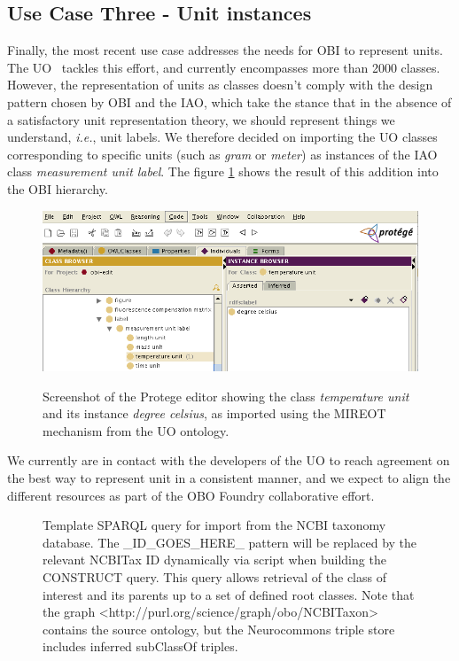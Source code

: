 \documentclass[jou]{ao2e}%
\begin{document}
\subsection{Use Case Three - Unit instances}

Finally, the most recent use case addresses the needs for \ac{OBI} to represent units. The \ac{UO}~\citep{PATO} tackles this effort, and currently encompasses more than 2000 classes. 
However, the representation of units as classes doesn't comply with the design pattern chosen by \ac{OBI} and the \ac{IAO}, which take the stance that in the absence of a satisfactory unit representation theory, we should represent things we understand, \emph{i.e.}, unit labels. 
We therefore decided on importing the \ac{UO} classes corresponding to specific units (such as \textit{gram} or \textit{meter}) as instances of the \ac{IAO} class \textit{measurement unit label}.
The figure \ref{fig:protege} shows the result of this addition into the \ac{OBI} hierarchy.

\begin{figure}[t]
\centering
{
\includegraphics[width=.9\linewidth]{./figs/protege.png}
}
\caption{Screenshot of the Protege editor showing the class \textit{temperature unit} and its instance \textit{degree celsius}, as imported using the \ac{MIREOT} mechanism from the \ac{UO} ontology.
}
\label{fig:protege}
\end{figure}

We currently are in contact with the developers of the \ac{UO} to reach agreement on the best way to represent unit in a consistent manner, and we expect to align the different resources as part of the \ac{OBO} Foundry collaborative effort.


\begin{figure}[t]
\scriptsize
 
\caption{Template SPARQL query for import from the NCBI taxonomy database. The \_ID\_GOES\_HERE\_ pattern will be replaced by the relevant NCBITax ID dynamically via script when building the CONSTRUCT query. This query allows retrieval of the class of interest and its parents up to a set of defined root classes. Note that the graph <http://purl.org/science/graph/obo/NCBITaxon> contains the source ontology, but the Neurocommons triple store includes inferred subClassOf triples.}
\label{fig:sparql2}
\end{figure}
\end{document}
